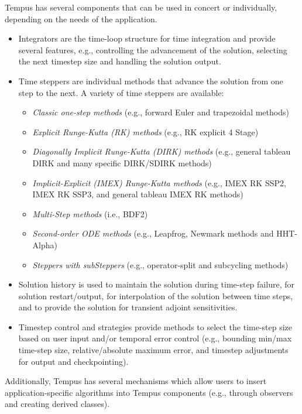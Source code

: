 Tempus has several components that can be used in concert or
individually, depending on the needs of the application.
\begin{itemize}
  \item Integrators are the time-loop structure for time integration
  and provide several features, e.g., controlling the advancement of
  the solution, selecting the next timestep size and handling the 
  solution output.

  \item Time steppers are individual methods that advance the
  solution from one step to the next.  A variety of time steppers
  are available:
  \begin{itemize}
    \item \emph{Classic one-step methods} (e.g., forward Euler and trapezoidal methods)
    \item \emph{Explicit Runge-Kutta (RK) methods} (e.g., RK explicit 4 Stage)
    \item \emph{Diagonally Implicit Runge-Kutta (DIRK) methods} (e.g.,
    general tableau DIRK and many specific DIRK/SDIRK methods)
    \item \emph{Implicit-Explicit (IMEX) Runge-Kutta methods} (e.g., IMEX
    RK SSP2, IMEX RK SSP3, and general tableau IMEX RK methods)
    \item \emph{Multi-Step methods} (i.e., BDF2)
    \item \emph{Second-order ODE methods} (e.g., Leapfrog, Newmark methods
    and HHT-Alpha)
    \item \emph{Steppers with subSteppers} (e.g., operator-split and
    subcycling methods)
  \end{itemize}

  \item Solution history is used to maintain the solution during
  time-step failure, for solution restart/output, for interpolation of
  the solution between time steps, and to provide the solution for
  transient adjoint sensitivities.

  \item Timestep control and strategies provide methods to select
  the time-step size based on user input and/or temporal error
  control (e.g., bounding min/max time-step size, relative/absolute
  maximum error, and timestep adjustments for output and checkpointing).
\end{itemize}

Additionally, Tempus has several mechanisms which allow users to
insert application-specific algorithms into Tempus components (e.g.,
through observers and creating derived classes).

